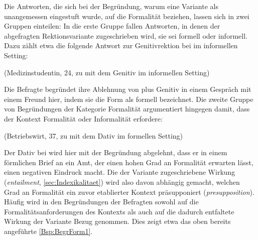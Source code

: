 Die Antworten, die sich bei der Begründung, warum eine Variante als unangemessen eingestuft wurde, auf die Formalität beziehen, lassen sich in zwei Gruppen einteilen:
In die erste Gruppe fallen Antworten, in denen der abgefragten Rektionsvariante zugeschrieben wird, sie sei formell oder informell. 
Dazu zählt etwa die folgende Antwort zur Genitivrektion bei \dank{} im informellen Setting: 
\begin{exe}
\ex {} (Medizinstudentin, 24, zu \dank{} mit dem Genitiv im informellen Setting)
\end{exe}
Die Befragte begründet ihre Ablehnung von \dank{} plus Genitiv in einem Gespräch mit einem Freund hier, indem sie die Form als formell bezeichnet. 
Die zweite Gruppe von Begründungen der Kategorie \glqq Formalität\grqq{} argumentiert hingegen damit, dass der Kontext Formalität oder Informalität erfordere:
\begin{exe}
\ex {} (Betriebswirt, 37, zu \wegen{} mit dem Dativ im formellen Setting)
\end{exe}
Der Dativ bei \wegen{} wird hier mit der Begründung abgelehnt, dass er in einem förmlichen Brief an ein Amt, der einen hohen Grad an Formalität erwarten lässt, einen negativen Eindruck macht.
Die der Variante zugeschriebene Wirkung (\textit{{en\-tail\-ment}}, \autoref{sec:Indexikalitaet}) wird also davon abhängig gemacht, welchen Grad an Formalität ein zuvor etablierter Kontext präsupponiert (\textit{presupposition}). 
Häufig wird in den Begründungen der Befragten sowohl auf die Formalitätsanforderungen des Kontexts als auch auf die dadurch entfaltete Wirkung der Variante Bezug genommen. 
Dies zeigt etwa das oben bereits angeführte \autoref{Bsp:BegrForm1}. 

